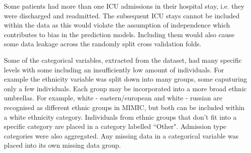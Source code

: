 \documentclass[11pt]{article}
\begin{document}


Some patients had more than one ICU admissions in their hospital stay, i.e. they were discharged and readmitted. The subsequent ICU stays cannot be included within the data as this would violate the assumption of independence\cite{Pfeifer2010} which contributes to bias in the prediction models. Including them would also cause some data leakage across the randomly split cross validation folds.


Some of the categorical variables, extracted from the dataset, had many specific levels with some including an insufficiently low amount of individuals. For example the ethnicity variable was split down into many groups, some caputuring only a few individuals. Each group may be incorporated into a more broad ethnic umbrellas. For example, white - eastern/european and white - russian are recognised as different ethnic groups in MIMIC, but both can be included within a white ethnicity category. Individuals from ethnic groups that don't fit into a specific category are placed in a category labelled ``Other". Admission type categories were also aggregated. Any missing data in a categorical variable was placed into its own missing data group.


\end{document}
